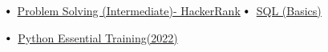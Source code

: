 \documentclass[letterpaper,11pt]{article}
\newcommand\sbullet[1][.5]{\mathbin{\vcenter{\hbox{\scalebox{#1}{$\bullet$}}}}}
\begin{document}
$\sbullet[.75] \hspace{0.2cm}${\href{https://www.hackerrank.com/certificates/90e93a3ef140}{Problem Solving (Intermediate)- HackerRank}} \hspace{1cm}
$\sbullet[.75] \hspace{0.1cm}$ {\href{https://www.hackerrank.com/certificates/0c8ab9e2960a}{SQL (Basics)}} \hspace{2.6cm}

$\sbullet[.75] \hspace{0.1cm}$ {\href{https://drive.google.com/file/d/1S1wRK5fm6CGY2MXcZqkmtFNMBcgmcdo4/view?usp=drive_link}{Python Essential Training(2022)}} \hspace{2.6cm}
\end{document}
